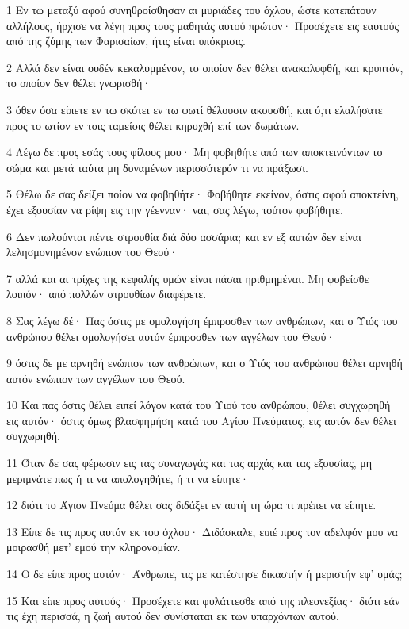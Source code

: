 \par 1 Εν τω μεταξύ αφού συνηθροίσθησαν αι μυριάδες του όχλου, ώστε κατεπάτουν αλλήλους, ήρχισε να λέγη προς τους μαθητάς αυτού πρώτον· Προσέχετε εις εαυτούς από της ζύμης των Φαρισαίων, ήτις είναι υπόκρισις.
\par 2 Αλλά δεν είναι ουδέν κεκαλυμμένον, το οποίον δεν θέλει ανακαλυφθή, και κρυπτόν, το οποίον δεν θέλει γνωρισθή·
\par 3 όθεν όσα είπετε εν τω σκότει εν τω φωτί θέλουσιν ακουσθή, και ό,τι ελαλήσατε προς το ωτίον εν τοις ταμείοις θέλει κηρυχθή επί των δωμάτων.
\par 4 Λέγω δε προς εσάς τους φίλους μου· Μη φοβηθήτε από των αποκτεινόντων το σώμα και μετά ταύτα μη δυναμένων περισσότερόν τι να πράξωσι.
\par 5 Θέλω δε σας δείξει ποίον να φοβηθήτε· Φοβήθητε εκείνον, όστις αφού αποκτείνη, έχει εξουσίαν να ρίψη εις την γέενναν· ναι, σας λέγω, τούτον φοβήθητε.
\par 6 Δεν πωλούνται πέντε στρουθία διά δύο ασσάρια; και εν εξ αυτών δεν είναι λελησμονημένον ενώπιον του Θεού·
\par 7 αλλά και αι τρίχες της κεφαλής υμών είναι πάσαι ηριθμημέναι. Μη φοβείσθε λοιπόν· από πολλών στρουθίων διαφέρετε.
\par 8 Σας λέγω δέ· Πας όστις με ομολογήση έμπροσθεν των ανθρώπων, και ο Υιός του ανθρώπου θέλει ομολογήσει αυτόν έμπροσθεν των αγγέλων του Θεού·
\par 9 όστις δε με αρνηθή ενώπιον των ανθρώπων, και ο Υιός του ανθρώπου θέλει αρνηθή αυτόν ενώπιον των αγγέλων του Θεού.
\par 10 Και πας όστις θέλει ειπεί λόγον κατά του Υιού του ανθρώπου, θέλει συγχωρηθή εις αυτόν· όστις όμως βλασφημήση κατά του Αγίου Πνεύματος, εις αυτόν δεν θέλει συγχωρηθή.
\par 11 Όταν δε σας φέρωσιν εις τας συναγωγάς και τας αρχάς και τας εξουσίας, μη μεριμνάτε πως ή τι να απολογηθήτε, ή τι να είπητε·
\par 12 διότι το Άγιον Πνεύμα θέλει σας διδάξει εν αυτή τη ώρα τι πρέπει να είπητε.
\par 13 Είπε δε τις προς αυτόν εκ του όχλου· Διδάσκαλε, ειπέ προς τον αδελφόν μου να μοιρασθή μετ' εμού την κληρονομίαν.
\par 14 Ο δε είπε προς αυτόν· Άνθρωπε, τις με κατέστησε δικαστήν ή μεριστήν εφ' υμάς;
\par 15 Και είπε προς αυτούς· Προσέχετε και φυλάττεσθε από της πλεονεξίας· διότι εάν τις έχη περισσά, η ζωή αυτού δεν συνίσταται εκ των υπαρχόντων αυτού.
